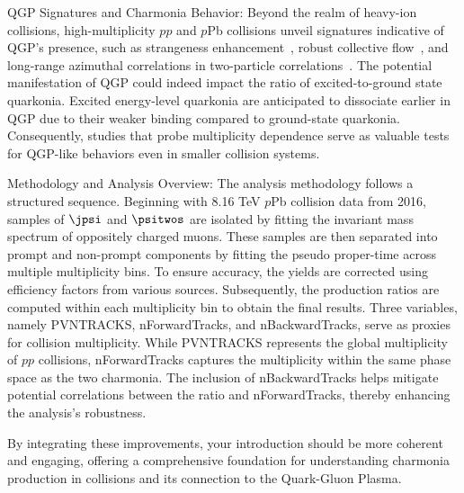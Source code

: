 QGP Signatures and Charmonia Behavior:
Beyond the realm of heavy-ion collisions, high-multiplicity $pp$ and $p$Pb collisions unveil signatures indicative of QGP's presence, such as strangeness enhancement~\cite{ALICE:2016fzo}, robust collective flow~\cite{CMS:2016fnw}, and long-range azimuthal correlations in two-particle correlations~\cite{CMS:2010ifv, ALICE:2012eyl, ATLAS:2012cix, LHCb:2015coe}. The potential manifestation of QGP could indeed impact the ratio of excited-to-ground state quarkonia. Excited energy-level quarkonia are anticipated to dissociate earlier in QGP due to their weaker binding compared to ground-state quarkonia. Consequently, studies that probe multiplicity dependence serve as valuable tests for QGP-like behaviors even in smaller collision systems.

Methodology and Analysis Overview:
The analysis methodology follows a structured sequence. Beginning with 8.16 TeV $p$Pb collision data from 2016, samples of $\jpsi$ and $\psitwos$ are isolated by fitting the invariant mass spectrum of oppositely charged muons. These samples are then separated into prompt and non-prompt components by fitting the pseudo proper-time across multiple multiplicity bins. To ensure accuracy, the yields are corrected using efficiency factors from various sources. Subsequently, the production ratios are computed within each multiplicity bin to obtain the final results. Three variables, namely PVNTRACKS, nForwardTracks, and nBackwardTracks, serve as proxies for collision multiplicity. While PVNTRACKS represents the global multiplicity of $pp$ collisions, nForwardTracks captures the multiplicity within the same phase space as the two charmonia. The inclusion of nBackwardTracks helps mitigate potential correlations between the ratio and nForwardTracks, thereby enhancing the analysis's robustness.

By integrating these improvements, your introduction should be more coherent and engaging, offering a comprehensive foundation for understanding charmonia production in collisions and its connection to the Quark-Gluon Plasma.
